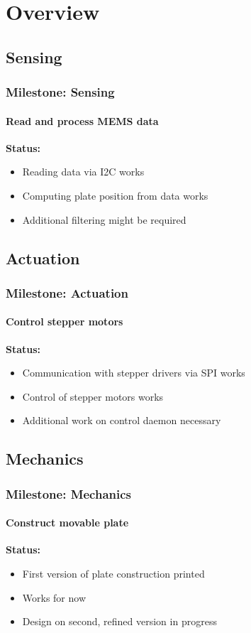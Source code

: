 \documentclass{beamer}
\begin{document}
\section{Overview}
\subsection{Sensing}
\begin{frame}
  \frametitle{Milestone: Sensing}
  \framesubtitle{Read and process MEMS data}
  \textbf{Status:}
  \begin{itemize}
    \item Reading data via I2C works
    \item Computing plate position from data works
    \item Additional filtering might be required
  \end{itemize}
\end{frame}

\subsection{Actuation}
\begin{frame}
  \frametitle{Milestone: Actuation}
  \framesubtitle{Control stepper motors}
  \textbf{Status:}
  \begin{itemize}
    \item Communication with stepper drivers via SPI works
    \item Control of stepper motors works
    \item Additional work on control daemon necessary
  \end{itemize}
\end{frame}

\subsection{Mechanics}
\begin{frame}
  \frametitle{Milestone: Mechanics}
  \framesubtitle{Construct movable plate}
  \textbf{Status:}
  \begin{itemize}
    \item First version of plate construction printed
    \item Works for now
    \item Design on second, refined version in progress
  \end{itemize}
\end{frame}
\end{document}
